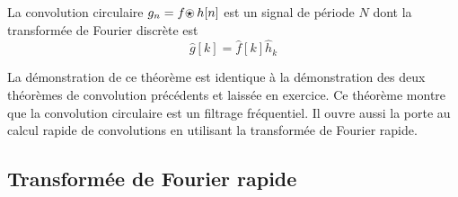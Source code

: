 \begin{theorem} 
\label{circulaire}
La convolution circulaire
$g_n = f {\mbox{$\odot \!\!\!\!\star~$}} h [n]$ est un signal de p\'eriode $N$ dont la
transform\'ee de Fourier discr\`ete est
\begin{equation}
\hat g[k] = \hat f[k] \hat h_k
\end{equation}
\end{theorem}

La d\'emonstration de ce th\'eor\`eme est identique \`a la
d\'emonstration des deux th\'eor\`emes de convolution pr\'ec\'edents
et laiss\'ee en exercice.
Ce th\'eor\`eme montre que la convolution circulaire est
un filtrage fr\'equentiel. Il ouvre aussi la porte au
calcul rapide de convolutions en utilisant la
transform\'ee de Fourier rapide.

\subsection{Transform\'ee de Fourier rapide}

